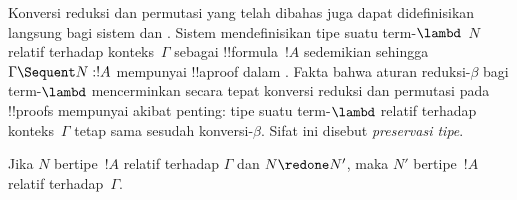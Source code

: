 \documentclass[../../../include/open-logic-section]{subfiles}
\begin{document}


Konversi reduksi dan permutasi yang telah dibahas juga dapat didefinisikan
langsung bagi sistem  dan . Sistem 
mendefinisikan tipe suatu term-$\lambd$~$N$ relatif terhadap konteks~$\Gamma$
sebagai !!{formula}~$!A$ sedemikian sehingga $\Gamma \Sequent N:!A$
mempunyai !!a{proof} dalam . Fakta bahwa aturan reduksi-$\beta$
bagi term-$\lambd$ mencerminkan secara tepat konversi reduksi dan permutasi
pada !!{proof}s mempunyai akibat penting: tipe suatu term-$\lambd$ relatif
terhadap konteks~$\Gamma$ tetap sama sesudah konversi-$\beta$. Sifat ini
disebut \emph{preservasi tipe}.

\begin{prop}
Jika $N$ bertipe~$!A$ relatif terhadap $\Gamma$ dan $N \redone N'$, maka
$N'$ bertipe~$!A$ relatif terhadap~$\Gamma$.
\end{prop}
\end{document}
